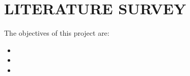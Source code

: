 \chapter{LITERATURE SURVEY}
	\label{chap:obj}
	
	The objectives of this project are:
	\begin{itemize}
		\item 
		\item 
		\item
	\end{itemize}